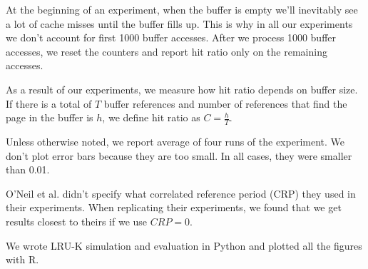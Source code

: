 
At the beginning of an experiment, when the buffer is empty we'll inevitably see a lot of cache misses until the buffer fills up. This is why in all our experiments we don't account for first 1000 buffer accesses. After we process 1000 buffer accesses, we reset the counters and report hit ratio only on the remaining accesses.

As a result of our experiments, we measure how hit ratio depends on buffer size. If there is a total of $T$ buffer references and number of references that find the page in the buffer is $h$, we define hit ratio as $C = \frac{h}{T}$.

Unless otherwise noted, we report average of four runs of the experiment. We don't plot error bars because they are too small. In all cases, they were smaller than 0.01.

O'Neil et al. \cite{lruk} didn't specify what correlated reference period (CRP) they used in their experiments. When replicating their experiments, we found that we get results closest to theirs if we use $CRP = 0$.

We wrote LRU-K simulation and evaluation in Python and plotted all the figures with R.